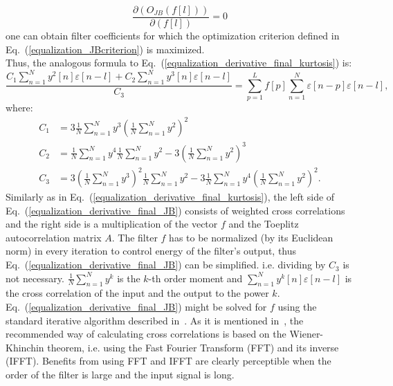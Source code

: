 \begin{equation}
\frac{\partial \left(O_{JB}\left(f\left[l\right]\right)\right)}{\partial \left(f[l]\right)}=0
\label{equalization_derivative_zero_JB}
\end{equation}
one can obtain filter coefficients for which the optimization criterion defined in Eq.~(\ref{equalization_JBcriterion}) is maximized.\\
Thus, the analogous formula to Eq.~(\ref{equalization_derivative_final_kurtosis}) is:
\begin{equation}
\frac{C_{1}\sum\limits_{n=1}^{N} y^2[n]\varepsilon[n-l]+C_{2}\sum\limits_{n=1}^{N} y^3[n]\varepsilon[n-l]}{C_3} = \sum\limits_{p=1}^{L} f[p] \sum\limits_{n=1}^{N} \varepsilon[n-p]\varepsilon[n-l],
\label{equalization_derivative_final_JB}
\end{equation}
where:
\begin{equation}
\begin{split}
C_1& =3\frac{1}{N}\sum\limits_{n=1}^{N} y^3 \left(\frac{1}{N}\sum\limits_{n=1}^{N} y^2\right)^2\\
C_2& =\frac{1}{N}\sum\limits_{n=1}^{N} y^4 \frac{1}{N}\sum\limits_{n=1}^{N} y^2-3\left(\frac{1}{N}\sum\limits_{n=1}^{N} y^2\right)^3\\
C_3& =3\left(\frac{1}{N}\sum\limits_{n=1}^{N} y^3\right)^2 \frac{1}{N}\sum\limits_{n=1}^{N} y^2-3\frac{1}{N}\sum\limits_{n=1}^{N} y^4 \left(\frac{1}{N}\sum\limits_{n=1}^{N} y^2\right)^2.
\end{split}\label{equalization_derivative_final_const}
\end{equation}
Similarly as in Eq.~(\ref{equalization_derivative_final_kurtosis}), the left side of Eq.~(\ref{equalization_derivative_final_JB}) consists of weighted cross correlations and the right side is a multiplication of  the vector $f$ and the Toeplitz autocorrelation matrix $A$. The filter $f$ has to be normalized (by its Euclidean norm) in every iteration to control energy of the filter's output, thus Eq.~(\ref{equalization_derivative_final_JB}) can be simplified. i.e. dividing by $C_3$ is not necessary. $\frac{1}{N}\sum\limits_{n=1}^{N} y^k$ is the $k$-th order moment and $\sum\limits_{n=1}^{N} y^k[n]\varepsilon[n-l]$ is the cross correlation of the input and the output to the power $k$. Eq.~(\ref{equalization_derivative_final_JB}) might be solved for $f$ using the standard iterative algorithm described in~\cite{Wiggins197821}. As it is mentioned in~\cite{Ooe1979458}, the recommended way of calculating cross correlations is based on the Wiener-Khinchin theorem, i.e. using the Fast Fourier Transform (FFT) and its inverse (IFFT). Benefits from using FFT and IFFT are clearly perceptible when the order of the filter is large and the input signal is long.\\
